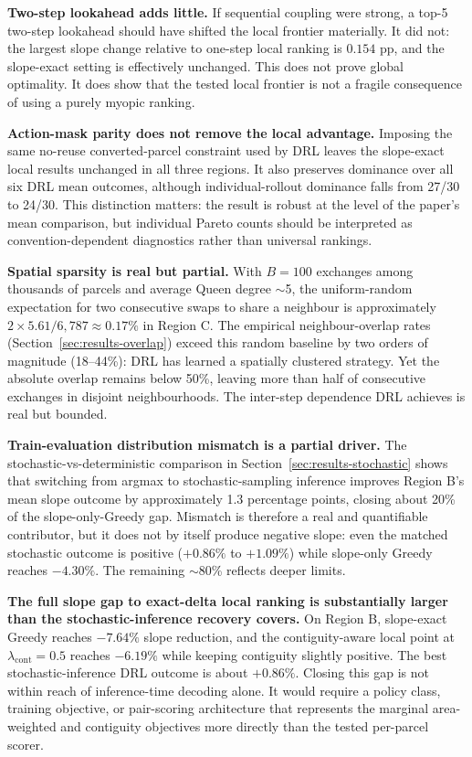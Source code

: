 \documentclass[]{interact}
\theoremstyle{plain}
\begin{document}
\textbf{Two-step lookahead adds little.} If sequential coupling were strong, a top-5 two-step lookahead should have shifted the local frontier materially. It did not: the largest slope change relative to one-step local ranking is $0.154$ pp, and the slope-exact setting is effectively unchanged. This does not prove global optimality. It does show that the tested local frontier is not a fragile consequence of using a purely myopic ranking.

\textbf{Action-mask parity does not remove the local advantage.} Imposing the same no-reuse converted-parcel constraint used by DRL leaves the slope-exact local results unchanged in all three regions. It also preserves dominance over all six DRL mean outcomes, although individual-rollout dominance falls from 27/30 to 24/30. This distinction matters: the result is robust at the level of the paper's mean comparison, but individual Pareto counts should be interpreted as convention-dependent diagnostics rather than universal rankings.

\textbf{Spatial sparsity is real but partial.} With $B = 100$ exchanges among thousands of parcels and average Queen degree $\sim$5, the uniform-random expectation for two consecutive swaps to share a neighbour is approximately $2 \times 5.61 / 6{,}787 \approx 0.17\%$ in Region C. The empirical neighbour-overlap rates (Section~\ref{sec:results-overlap}) exceed this random baseline by two orders of magnitude (18--44\%): DRL has learned a spatially clustered strategy. Yet the absolute overlap remains below 50\%, leaving more than half of consecutive exchanges in disjoint neighbourhoods. The inter-step dependence DRL achieves is real but bounded.

\textbf{Train-evaluation distribution mismatch is a partial driver.} The stochastic-vs-deterministic comparison in Section~\ref{sec:results-stochastic} shows that switching from argmax to stochastic-sampling inference improves Region B's mean slope outcome by approximately 1.3 percentage points, closing about 20\% of the slope-only-Greedy gap. Mismatch is therefore a real and quantifiable contributor, but it does not by itself produce negative slope: even the matched stochastic outcome is positive ($+0.86\%$ to $+1.09\%$) while slope-only Greedy reaches $-4.30\%$. The remaining $\sim$80\% reflects deeper limits.

\textbf{The full slope gap to exact-delta local ranking is substantially larger than the stochastic-inference recovery covers.} On Region B, slope-exact Greedy reaches $-7.64\%$ slope reduction, and the contiguity-aware local point at $\lambda_{\mathrm{cont}}=0.5$ reaches $-6.19\%$ while keeping contiguity slightly positive. The best stochastic-inference DRL outcome is about $+0.86\%$. Closing this gap is not within reach of inference-time decoding alone. It would require a policy class, training objective, or pair-scoring architecture that represents the marginal area-weighted and contiguity objectives more directly than the tested per-parcel scorer.
\end{document}
